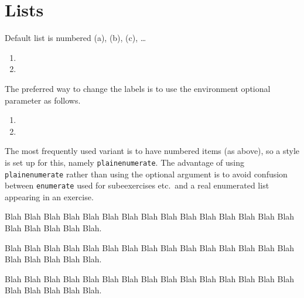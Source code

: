 \documentclass[solutionsatend,twocolumnsolutions]{ouunit}
\begin{document}
\section{Lists}
Default list is numbered (a), (b), (c), \ldots
\begin{enumerate}
\item
\lipsum[133]
\item
\lipsum[133]
\end{enumerate}
The preferred way to change the labels is to use the environment optional parameter as follows.
\begin{enumerate}[1.]
\item
\lipsum[133]
\item
\lipsum[133]
\end{enumerate}
The most frequently used variant is to have numbered items (as above), so a style is set up for this, namely \verb"plainenumerate". The advantage of using \verb"plainenumerate" rather than using the optional argument is to avoid confusion between \verb"enumerate" used for subeexercises etc.\ and a real enumerated list appearing in an exercise. 
\begin{plainenumerate}
\item Blah Blah Blah Blah Blah Blah Blah Blah Blah Blah Blah Blah Blah Blah Blah Blah Blah Blah Blah Blah.
\item Blah Blah Blah Blah Blah Blah Blah Blah Blah Blah Blah Blah Blah Blah Blah Blah Blah Blah Blah Blah.
\item Blah Blah Blah Blah Blah Blah Blah Blah Blah Blah Blah Blah Blah Blah Blah Blah Blah Blah Blah Blah.
\end{plainenumerate}
\end{document}
